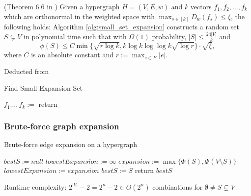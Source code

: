 \documentclass{beamer}
\begin{document}
\begin{frame}
	\begin{theorem}{(Theorem 6.6 in \cite{ChanLTZ16})}\label{theorem:small_xi}
		Given a hypergraph $H = (V, E, w)$ and $k$ vectors $f_1, f_2, \ldots , f_k$ which are orthonormal in the weighted space with $ \max_{s \in [k]} D_w(f_s) \le \xi $, the following holds: Algorithm \ref{alg:small_set_expansion} constructs a random set $S \subsetneq V$ in polynomial time such that with $\Omega(1)$ probability, $|S| \le \frac{24|V|}{k}$ and
		\begin{equation}\label{eq:small_expansion}
		\phi(S) \le C \min\{\sqrt{r \log k}, k \log k  \log \log k \sqrt{\log r} \} \cdot \sqrt{\xi},
		\end{equation}
		where $C$ is an absolute constant and $r := \max_{e\in E} |e|$.
	\end{theorem}
\end{frame}


\begin{frame}
	Deducted from \cite{ChanLTZ16}
\begin{algorithm}[H]
	\caption{Find Small Expansion Set \label{alg:ses}} 
	\begin{algorithmic}[0]
		\State $f_1 \ldots, f_k := $
		\State return 
		\EndFunction 
	\end{algorithmic}
\end{algorithm}	
\end{frame}


\begin{frame}

\frametitle{Brute-force graph expansion}
\begin{algorithm}[H]
	\caption{Brute-force edge expansion on a hypergraph \label{alg:brute_force}}
	\begin{algorithmic}[0]
		\State $bestS := null$
		\State $lowestExpansion := \infty$
		\State $expansion :=  \max\{ \Phi(S), \Phi({V\setminus S})\}$
		\State $lowestExpansion := expansion$
		\State $bestS := S$
		\EndIf
		\EndFor	
		\State return $bestS$
		\EndFunction
	\end{algorithmic}
\end{algorithm}
Runtime complexity:  $2^{|V|}-2 = 2^{n}-2 \in O(2^n) $ combinations for $\emptyset \neq S \subsetneq V$
\end{frame}
\end{document}
